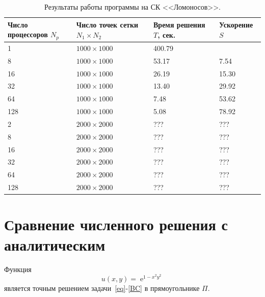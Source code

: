 \documentclass[11pt]{article}
\numberwithin{equation}{section}
\theoremstyle{plain}
\theoremstyle{definition}
\DeclareMathOperator{\expon}{e}
\begin{document}
\begin{table}[h]
\centering
\begin{tabular}{|l|l|l|l|}\hline
Число процессоров $N_p$ & Число точек сетки $N_1 \times N_2$ & Время решения $T$, сек. & Ускорение $S$ \\ \hline
1                       & $1000 \times 1000$                 & 400.79                  &               \\
8                       & $1000 \times 1000$                 & 53.17                   & 7.54          \\
16                      & $1000 \times 1000$                 & 26.19                   & 15.30         \\
32                      & $1000 \times 1000$                 & 13.40                   & 29.92         \\
64                      & $1000 \times 1000$                 & 7.48                    & 53.62         \\
128                     & $1000 \times 1000$                 & 5.08                    & 78.92         \\ \hline
2                       & $2000 \times 2000$                 & ???                     & ???           \\
8                       & $2000 \times 2000$                 & ???                     & ???           \\
16                      & $2000 \times 2000$                 & ???                     & ???           \\
32                      & $2000 \times 2000$                 & ???                     & ???           \\
64                      & $2000 \times 2000$                 & ???                     & ???           \\
128                     & $2000 \times 2000$                 & ???                     & ???           \\ \hline
\end{tabular}
    \caption{Результаты работы программы на СК <<Ломоносов>>.}
\label{tab_lom}
\end{table}

\newpage
\section{Сравнение численного решения с аналитическим}
Функция \[u(x,y)=\expon^{1-x^2y^2}\]
является точным решением задачи~\eqref{eq}-\eqref{BC} в прямоугольнике \(\Pi.\)
\end{document}
